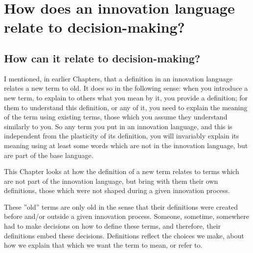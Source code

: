 \chapter{How does an innovation language relate to decision-making?}
\label{c6}


\section{How can it relate to decision-making?}
\label{c6:s1}
I mentioned, in earlier Chapters, that a definition in an innovation language relates a new term to old. It does so in the following sense: when you introduce a new term, to explain to others what you mean by it, you provide a definition; for them to understand this definition, or any of it, you need to explain the meaning of the term using existing terms, those which you assume they understand similarly to you. So any term you put in an innovation language, and this is independent from the plasticity of its definition, you will invariably explain its meaning using at least some words which are not in the innovation language, but are part of the base language.

This Chapter looks at how the definition of a new term relates to terms which are not part of the innovation language, but bring with them their own definitions, those which were not shaped during a given innovation process.

These ''old'' terms are only old in the sense that their definitions were created before and/or outside a given innovation process. Someone, sometime, somewhere had to make decisions on how to define these terms, and therefore, their definitions embed these decisions. Definitions reflect the choices we make, about how we explain that which we want the term to mean, or refer to.


